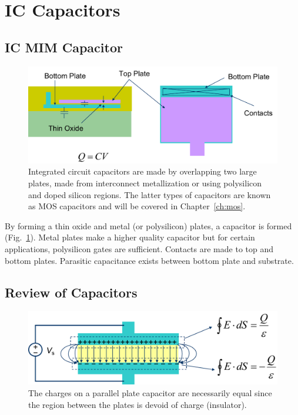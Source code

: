 \section{IC Capacitors}
\subsection{IC MIM Capacitor}
\begin{figure}[tb]
\begin{center}
\includegraphics[width=.75\columnwidth]{mod2-2_ICtech_sld_17}
\end{center}
\caption{Integrated circuit capacitors are made by overlapping two large plates, made from interconnect metallization or using polysilicon and doped silicon regions.  The latter types of capacitors are known as MOS capacitors and will be covered in Chapter~\ref{ch:mos}.}
\label{fig:mod2-2_ICtech_sld_17}
\end{figure}

By forming a thin oxide and metal (or polysilicon) plates, a capacitor is formed (Fig.~\ref{fig:mod2-2_ICtech_sld_17}).  Metal plates make a higher quality capacitor but for certain applications, polysilicon gates are sufficient.   Contacts are made to top and bottom plates.   Parasitic capacitance exists between bottom plate and substrate.
\subsection{Review of Capacitors}
\begin{figure}[tbh]
\begin{center}
\includegraphics[width=.75\columnwidth]{mod2-2_ICtech_sld_18}
\end{center}
\caption{The charges on a parallel plate capacitor are necessarily equal since the region between the plates is devoid of charge (insulator).}
\label{fig:mod2-2_ICtech_sld_18}
\end{figure}

